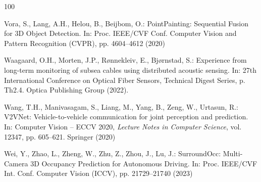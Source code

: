 \documentclass[graybox,envcountchap]{style/SNmono}
\begin{document}
\begin{thebibliography}{100}
{\par}
{\color{red} 
Vora, S., Lang, A.H., Helou, B., Beijbom, O.: {PointPainting: Sequential Fusion
  for 3D Object Detection}.
\newblock In: Proc. IEEE/CVF Conf. Computer Vision and Pattern Recognition
  (CVPR), pp. 4604--4612 (2020)

\par}

Waagaard, O.H., Morten, J.P., R{\o}nnekleiv, E., Bj{\o}rnstad, S.: Experience
  from long-term monitoring of subsea cables using distributed acoustic
  sensing.
\newblock In: 27th International Conference on Optical Fiber Sensors, Technical
  Digest Series, p. Th2.4. Optica Publishing Group (2022).
\newblock {}


{\color{red} 
Wang, T.H., Manivasagam, S., Liang, M., Yang, B., Zeng, W., Urtasun, R.:
  {V2VNet}: Vehicle-to-vehicle communication for joint perception and
  prediction.
\newblock In: Computer Vision -- ECCV 2020, \emph{Lecture Notes in Computer
  Science}, vol. 12347, pp. 605--621. Springer (2020)

\par}
{\color{red} 
Wei, Y., Zhao, L., Zheng, W., Zhu, Z., Zhou, J., Lu, J.: {SurroundOcc:
  Multi-Camera 3D Occupancy Prediction for Autonomous Driving}.
\newblock In: Proc. IEEE/CVF Int. Conf. Computer Vision (ICCV), pp.
  21729--21740 (2023)

\par}
\end{thebibliography}
\end{document}
